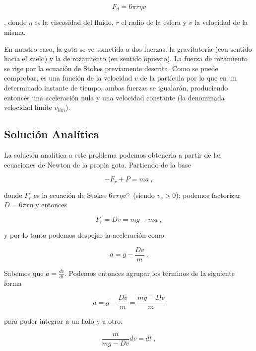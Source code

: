 \documentclass[journal]{IEEEtran}
\begin{document}
\begin{equation}
  F_d = 6 \pi r \eta v
\end{equation}

, donde $\eta$ es la viscosidad del fluido, $r$ el radio de la esfera y $v$ la velocidad de la misma.

En nuestro caso, la gota se ve sometida a dos fuerzas: la gravitatoria (con sentido hacia el suelo) y la de rozamiento (en sentido opuesto). La fuerza de rozamiento se rige por la ecuación de Stokes previamente descrita. Como se puede comprobar, es una función de la velocidad $v$ de la partícula por lo que en un determinado instante de tiempo, ambas fuerzas se igualarán, produciendo entonces una aceleración nula y una velocidad constante (la denominada velocidad límite
$v_{lim}$).

\subsection{Solución Analítica}

La solución analítica a este problema podemos obtenerla a partir de las ecuaciones de Newton de la propia gota. Partiendo de la base

\begin{equation}
- F_r + P = m a~,
\end{equation}

donde $F_r$ es la ecuación de Stokes $6\pi r \eta v^{v_e}$ (siendo $v_e > 0$); podemos factorizar $D = 6\pi r \eta$ y entonces

\begin{equation}
  F_r = Dv = mg - ma~,
\end{equation}

y por lo tanto podemos despejar la aceleración como

\begin{equation}
  a = g - \displaystyle\frac{Dv}{m}~.
\end{equation}

Sabemos que $a = \displaystyle\frac{dv}{dt}$. Podemos entonces agrupar los términos de la siguiente forma

\begin{equation}
  a = g - \displaystyle\frac{Dv}{m} = \displaystyle\frac{mg - Dv}{m}
\end{equation}

para poder integrar a un lado y a otro:

\begin{equation}
  \displaystyle\frac{m}{mg - Dv} dv = dt~,
\end{equation}
\end{document}
